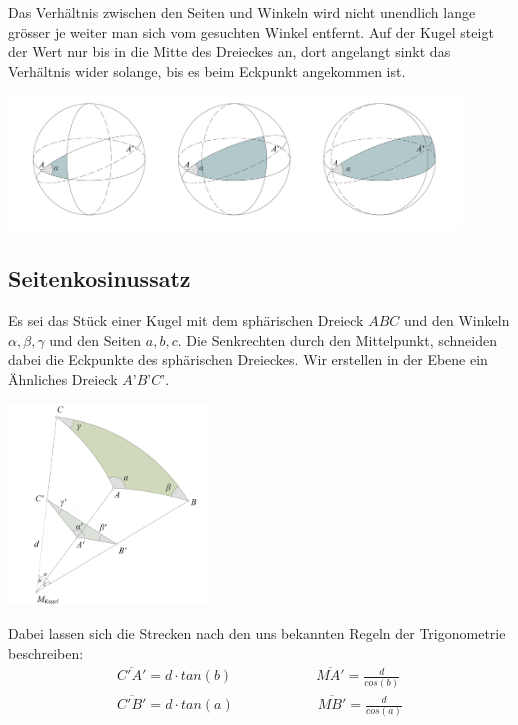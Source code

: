 \begin{refsection}
Das Verhältnis zwischen den Seiten und Winkeln wird nicht unendlich lange grösser je weiter man sich vom gesuchten Winkel entfernt. Auf der Kugel steigt der Wert nur bis in die Mitte des Dreieckes an, dort angelangt sinkt das Verhältnis wider solange, bis es beim Eckpunkt angekommen ist.

\begin{center}
        \includegraphics[width=0.9\textwidth]{kugel/SinussatzB.jpg}
\end{center}

\subsection{Seitenkosinussatz}
Es sei das Stück einer Kugel mit dem sphärischen Dreieck $ABC$ und den Winkeln $\alpha, \beta, \gamma$ und den Seiten $a, b, c$. Die Senkrechten durch den Mittelpunkt, schneiden dabei die Eckpunkte des sphärischen Dreieckes. Wir erstellen in der Ebene ein Ähnliches Dreieck $A’B’C’$.

\begin{center}
        \includegraphics[width=0.4\textwidth]{kugel/Seitenkosinus.jpg}
\end{center}

Dabei lassen sich die Strecken nach den uns bekannten Regeln der Trigonometrie beschreiben:
\begin{align*}
\overline{C'A'} = d\cdot {tan(b)} \quad \quad \quad \quad \quad \quad 
\overline{MA'} = \frac{ d }{cos(b)} \\
\overline{C'B'} = d\cdot {tan(a)} \quad \quad \quad \quad \quad \quad 
\overline{MB'} = \frac{ d }{cos(a)}
\end{align*} 



\end{refsection}
